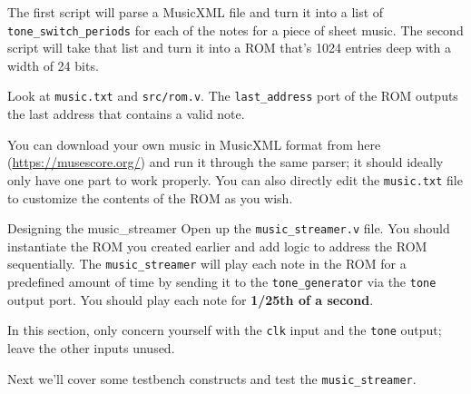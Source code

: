 \documentclass[11pt]{article}
\makeatletter
\renewcommand{\section}
{\@startsection {section}{1}{0pt}
 {-2ex}
 {1ex}
 {\bfseries\Large}}
\makeatother
\begin{document}
The first script will parse a MusicXML file and turn it into a list of \verb|tone_switch_periods| for each of the notes for a piece of sheet music.
The second script will take that list and turn it into a ROM that's 1024 entries deep with a width of 24 bits.

Look at \verb|music.txt| and \verb|src/rom.v|.
The \verb|last_address| port of the ROM outputs the last address that contains a valid note.

You can download your own music in MusicXML format from here (\url{https://musescore.org/}) and run it through the same parser; it should ideally only have one part to work properly.
You can also directly edit the \verb|music.txt| file to customize the contents of the ROM as you wish.

\section{Designing the music\_streamer}
Open up the \verb|music_streamer.v| file.
You should instantiate the ROM you created earlier and add logic to address the ROM sequentially.
The \verb|music_streamer| will play each note in the ROM for a predefined amount of time by sending it to the \verb|tone_generator| via the \verb|tone| output port.
You should play each note for \textbf{1/25th of a second}.

In this section, only concern yourself with the \verb|clk| input and the \verb|tone| output; leave the other inputs unused.

Next we'll cover some testbench constructs and test the \verb|music_streamer|.


\end{document}
